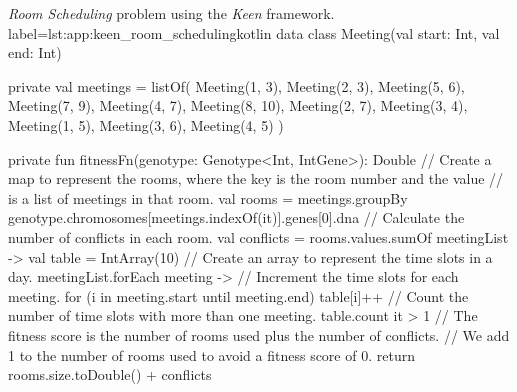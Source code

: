   \begin{code}{
    \textit{Room Scheduling} problem using the \textit{Keen} framework.
  }{label=lst:app:keen_room_scheduling}{kotlin}
    data class Meeting(val start: Int, val end: Int)

    private val meetings =
        listOf(
            Meeting(1, 3),
            Meeting(2, 3),
            Meeting(5, 6),
            Meeting(7, 9),
            Meeting(4, 7),
            Meeting(8, 10),
            Meeting(2, 7),
            Meeting(3, 4),
            Meeting(1, 5),
            Meeting(3, 6),
            Meeting(4, 5)
        )

    private fun fitnessFn(genotype: Genotype<Int, IntGene>): Double {
        // Create a map to represent the rooms, where the key is the room number and the value 
        // is a list of meetings in that room.
        val rooms = meetings.groupBy { 
            genotype.chromosomes[meetings.indexOf(it)].genes[0].dna 
        }
        // Calculate the number of conflicts in each room.
        val conflicts = rooms.values.sumOf { meetingList ->
            val table = IntArray(10) // Create an array to represent the time slots in a day.
            meetingList.forEach { meeting ->
                // Increment the time slots for each meeting.
                for (i in meeting.start until meeting.end) {
                    table[i]++
                }
            }
            // Count the number of time slots with more than one meeting.
            table.count { it > 1 }
        }
        // The fitness score is the number of rooms used plus the number of conflicts.
        // We add 1 to the number of rooms used to avoid a fitness score of 0.
        return rooms.size.toDouble() + conflicts
    }


\end{code}
